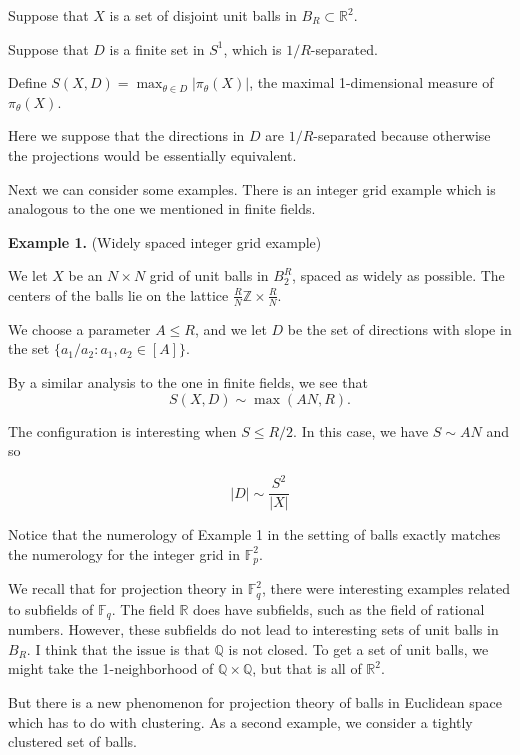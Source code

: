 \documentclass[12pt]{amsart}
\newcommand{\FF}{\mathbb{F}}
\newcommand{\QQ}{\mathbb{Q}}
\newcommand{\ZZ}{\mathbb{Z}}
\newcommand{\RR}{\mathbb{R}}
\begin{document}
Suppose that $X$ is a set of disjoint unit balls in $B_R \subset \RR^2$.

Suppose that $D$ is a finite set in $S^1$, which is $1/R$-separated.

Define $S(X,D) = \max_{\theta \in D} | \pi_\theta(X) |$, the maximal 1-dimensional measure of $\pi_\theta(X)$.

\vskip10pt

Here we suppose that the directions in $D$ are $1/R$-separated because otherwise the projections would be essentially equivalent.

\vskip10pt

Next we can consider some examples.  There is an integer grid example which is analogous to the one we mentioned in finite fields.

\vskip10pt

{\bf Example 1.} (Widely spaced integer grid example) 

We let $X$ be an $N \times N$ grid of unit balls in $B_2^R$, spaced as widely as possible.  The centers of the balls lie on the lattice $\frac{R}{N} \ZZ \times \frac{R}{N}$.  

We choose a parameter $A \le R$, and we let $D$ be the set of directions with slope in the set $\{ a_1/a_2: a_1, a_2 \in [A] \}$.  

By a similar analysis to the one in finite fields, we see that 
$$ S(X,D) \sim \max(AN, R).$$  

The configuration is interesting when $S \le R/2$.  In this case, we have $S \sim AN$ and so

\begin{equation} \label{gridbound}
|D| \sim \frac{S^2}{|X|}
\end{equation}

\vskip10pt

Notice that the numerology of Example 1 in the setting of balls exactly matches the numerology for the integer grid in $\FF_p^2$.

We recall that for projection theory in $\FF_q^2$, there were interesting examples related to subfields of $\FF_q$.  The field $\RR$ does have subfields, such as the field of rational numbers.  However, these subfields do not lead to interesting sets of unit balls in $B_R$.  I think that the issue is that $\QQ$ is not closed.  To get a set of unit balls, we might take the 1-neighborhood of $\QQ \times \QQ$, but that is all of $\RR^2$.

But there is a new phenomenon for projection theory of balls in Euclidean space which has to do with clustering.  As a second example, we consider a tightly clustered set of balls.
\end{document}
